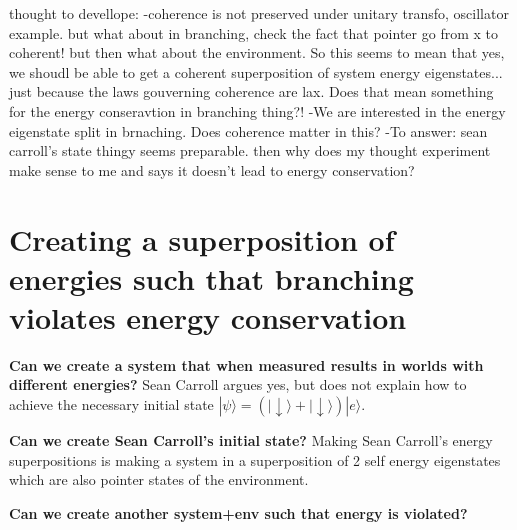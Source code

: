 \documentclass{article}
\begin{document}
thought to devellope: 
-coherence is not preserved under unitary transfo, oscillator example. but what about in branching, check the fact that pointer go from x to coherent! but then what about the environment. So this seems to mean that yes, we shoudl be able to get a coherent superposition of system energy eigenstates... just because the laws gouverning coherence are lax. 
Does that mean something for the energy conseravtion in branching thing?!
-We are interested in the energy eigenstate split in brnaching. Does coherence matter in this? 
-To answer: sean carroll's state thingy seems preparable. then why does my thought experiment make sense to me and says it doesn't lead to energy conservation? 

\section{Creating a superposition of energies such that branching violates energy conservation}

\textbf{Can we create a system that when measured results in worlds with different energies?} Sean Carroll argues yes, but does not explain how to achieve the necessary initial state $|\psi\rangle=(|\downarrow\rangle+|\downarrow\rangle)|e\rangle$. 

\textbf{Can we create Sean Carroll's initial state?} Making Sean Carroll's energy superpositions is making a system in a superposition of 2 self energy eigenstates which are also pointer states of the environment.

\textbf{Can we create another system+env such that energy is violated?}



\end{document}
